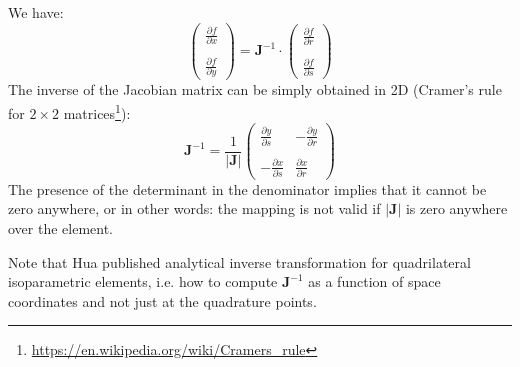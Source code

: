 We have:
\[
\left(
\begin{array}{c}
\frac{\partial f}{\partial x} \\ \\
\frac{\partial f}{\partial y}
\end{array}
\right)
=
{\bm J}^{-1} \cdot 
\left(
\begin{array}{c}
\frac{\partial f}{\partial r} \\ \\
\frac{\partial f}{\partial s}
\end{array}
\right)
\]
The inverse of the Jacobian matrix can be simply obtained in 
2D (Cramer's rule for $2\times2$ matrices\footnote{\url{https://en.wikipedia.org/wiki/Cramers_rule}}):
\[
{\bm J}^{-1} = \frac{1}{|{\bm J}|} 
\left(
\begin{array}{cc}
\frac{\partial y}{\partial s} & -\frac{\partial y}{\partial r} \nonumber\\ \\
-\frac{\partial x}{\partial s} & \frac{\partial x}{\partial r} \nonumber
\end{array}
\right)
\]
The presence of the determinant in the denominator implies that it cannot 
be zero anywhere, or in other words: the mapping is not valid if $|{\bm J}|$
is zero anywhere over the element.

Note that Hua \cite{hua90} published analytical inverse transformation for quadrilateral
isoparametric elements, i.e. how to compute ${\bm J}^{-1}$ as a function of space coordinates
and not just at the quadrature points. 

